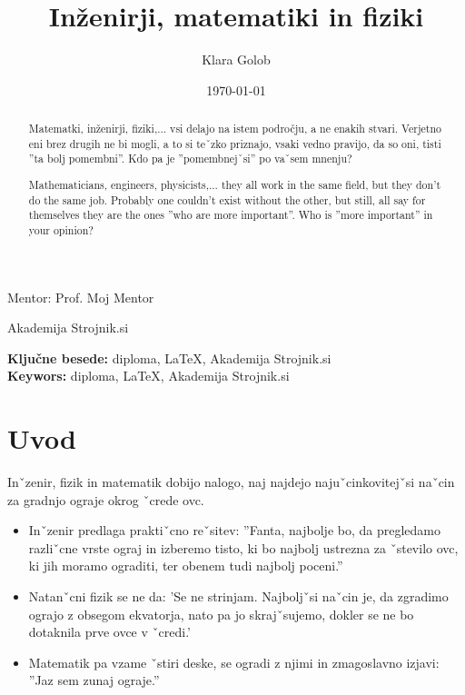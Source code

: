 \documentclass[12pt, a4paper]{article}
\title{Inženirji, matematiki in fiziki}
\author{Klara Golob}
\date{\today}
\begin{document}
\begin{titlepage}
\maketitle

\centering Mentor: Prof. Moj Mentor

\vfill
Akademija Strojnik.si
\thispagestyle{empty}
\end{titlepage}

\tableofcontents
\listoffigures
\listoftables

\newpage 

\begin{abstract}
Matematki, inženirji, fiziki,... vsi delajo na istem področju, a ne enakih stvari. Verjetno eni brez drugih ne bi mogli, a to si teˇzko priznajo, vsaki vedno pravijo, da so oni, tisti ”ta bolj pomembni”. Kdo pa je ”pomembnejˇsi” po vaˇsem mnenju?
\end{abstract}

\begin{abstract}
Mathematicians, engineers, physicists,... they all work in the same field, but they don’t do the same job. Probably one couldn’t exist without the other, but still, all say for themselves they are the ones ”who are more important”. Who is ”more important” in your opinion?
\end{abstract}

\vfill
\noindent
{\bf Ključne besede:} diploma, LaTeX, Akademija Strojnik.si \\
{\bf Keywors:} diploma, LaTeX, Akademija Strojnik.si 

\newpage
\null
\newpage

\section{Uvod}
Inˇzenir, fizik in matematik dobijo nalogo, naj najdejo najuˇcinkovitejˇsi naˇcin za gradnjo ograje okrog ˇcrede ovc.

\begin{itemize}
\item Inˇzenir predlaga praktiˇcno reˇsitev: ”Fanta, najbolje bo, da pregledamo razliˇcne vrste ograj in izberemo tisto, ki bo najbolj ustrezna za ˇstevilo ovc, ki jih moramo ograditi, ter obenem tudi najbolj poceni.”
\item Natanˇcni fizik se ne da: ’Se ne strinjam. Najboljˇsi naˇcin je, da zgradimo ograjo z obsegom ekvatorja, nato pa jo skrajˇsujemo, dokler se ne bo dotaknila prve ovce v ˇcredi.’
\item Matematik pa vzame ˇstiri deske, se ogradi z njimi in zmagoslavno izjavi: ”Jaz sem zunaj ograje.”
\end{itemize}
\end{document}

